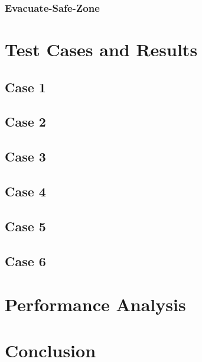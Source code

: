 \documentclass{article}
\begin{document}
\subsubsection{Evacuate-Safe-Zone}

\section{Test Cases and Results}

\subsection{Case 1}

\subsection{Case 2}

\subsection{Case 3}

\subsection{Case 4}

\subsection{Case 5}

\subsection{Case 6}

\section{Performance Analysis}

\section{Conclusion}
\end{document}
